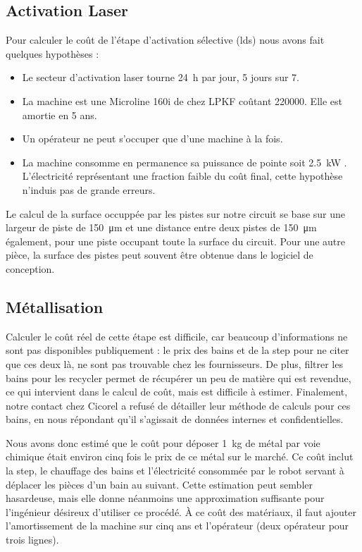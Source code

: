 \subsection{Activation Laser}
Pour calculer le coût de l'étape d'activation sélective (\gls{lds}) nous avons fait quelques hypothèses :
\begin{itemize}
    \item Le secteur d'activation laser tourne \SI{24}{\hour} par jour, 5 jours sur 7.
    \item La machine est une Microline 160i de chez LPKF coûtant \SI{220000}{\chf}.
        Elle est amortie en 5 ans.
    \item Un opérateur ne peut s'occuper que d'une machine à la fois.
    \item La machine consomme en permanence sa puissance de pointe soit \SI{2.5}{\kilo\watt} \cite{lpkf-microline-series}.
        L'électricité représentant une fraction faible du coût final, cette hypothèse n'induis pas de grande erreurs.
\end{itemize}

Le calcul de la surface occuppée par les pistes sur notre circuit se base sur une largeur de piste de \SI{150}{\micro\meter} et une
distance entre deux pistes de \SI{150}{\micro\meter} également, pour une piste occupant toute la surface du circuit.
Pour une autre pièce, la surface des pistes peut souvent être obtenue dans le logiciel de conception.



\subsection{Métallisation}
Calculer le coût réel de cette étape est difficile, car beaucoup d'informations ne sont pas disponibles publiquement : le prix des bains et de la \gls{step} pour ne citer que ces deux là, ne sont pas trouvable chez les fournisseurs.
De plus, filtrer les bains pour les recycler permet de récupérer un peu de matière qui est revendue, ce qui intervient dans le calcul de coût, mais est difficile à estimer.
Finalement, notre contact chez Cicorel a refusé de détailler leur méthode de calculs pour ces bains, en nous répondant qu'il s'agissait de données internes et confidentielles.

Nous avons donc estimé que le coût pour déposer \SI{1}{\kilogram} de métal par voie chimique était environ cinq fois le prix de ce métal sur le marché.
Ce coût inclut la \gls{step}, le chauffage des bains et l'électricité consommée par le robot servant à déplacer les pièces d'un bain au suivant. 
Cette estimation peut sembler hasardeuse, mais elle donne néanmoins une approximation suffisante pour l'ingénieur désireux d'utiliser ce procédé.
À ce coût des matériaux, il faut ajouter l'amortissement de la machine sur cinq ans et l'opérateur (deux opérateur pour trois lignes).

